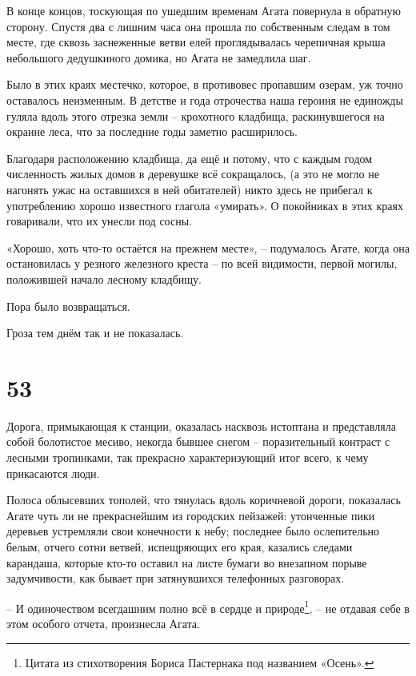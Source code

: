 \documentclass[
  a5paperpaper,
  DIV=11,
  numbers=noendperiod]{scrreprt}
\begin{document}
В конце концов, тоскующая по ушедшим временам Агата повернула в обратную
сторону. Спустя два с лишним часа она прошла по собственным следам в том
месте, где сквозь заснеженные ветви елей проглядывалась черепичная крыша
небольшого дедушкиного домика, но Агата не замедлила шаг.

Было в этих краях местечко, которое, в противовес пропавшим озерам, уж
точно оставалось неизменным. В детстве и года отрочества наша героиня не
единожды гуляла вдоль этого отрезка земли -- крохотного кладбища,
раскинувшегося на окраине леса, что за последние годы заметно
расширилось.

Благодаря расположению кладбища, да ещё и потому, что с каждым годом
численность жилых домов в деревушке всё сокращалось, (а это не могло не
нагонять ужас на оставшихся в ней обитателей) никто здесь не прибегал к
употреблению хорошо известного глагола «умирать». О покойниках в этих
краях говаривали, что их унесли под сосны.

«Хорошо, хоть что-то остаётся на прежнем месте», -- подумалось Агате,
когда она остановилась у резного железного креста -- по всей видимости,
первой могилы, положившей начало лесному кладбищу.

Пора было возвращаться.

Гроза тем днём так и не показалась.

\section*{53}\label{53}


Дорога, примыкающая к станции, оказалась насквозь истоптана и
представляла собой болотистое месиво, некогда бывшее снегом --
поразительный контраст с лесными тропинками, так прекрасно
характеризующий итог всего, к чему прикасаются люди.

Полоса облысевших тополей, что тянулась вдоль коричневой дороги,
показалась Агате чуть ли не прекраснейшим из городских пейзажей:
утонченные пики деревьев устремляли свои конечности к небу; последнее
было ослепительно белым, отчего сотни ветвей, испещряющих его края,
казались следами карандаша, которые кто-то оставил на листе бумаги во
внезапном порыве задумчивости, как бывает при затянувшихся телефонных
разговорах.

-- И одиночеством всегдашним полно всё в сердце и природе\footnote{Цитата
  из стихотворения Бориса Пастернака под названием «Осень».}, -- не
отдавая себе в этом особого отчета, произнесла Агата.
\end{document}
